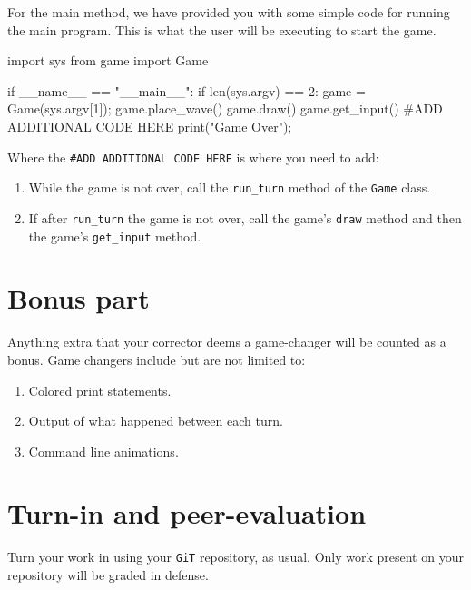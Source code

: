 \documentclass{42-en}
\begin{document}
\makeheaderfiles
For the main method, we have provided you with some simple code for running the main program.
This is what the user will be executing to start the game.
\begin{42pycode}
import sys
from game import Game

if __name__ == "__main__":
	if len(sys.argv) == 2:
		game = Game(sys.argv[1]);
		game.place_wave()
		game.draw()
		game.get_input()
		#ADD ADDITIONAL CODE HERE
		print("Game Over");
\end{42pycode}
Where the \texttt{\#ADD ADDITIONAL CODE HERE} is where you need to add:
\begin{enumerate}\itemsep7pt
    \item While the game is not over, call the \texttt{run\_turn} method of the \texttt{Game} class.
    \item If after \texttt{run\_turn} the game is not over, call the game's \texttt{draw} method and then the game's \texttt{get\_input} method.
\end{enumerate}

\nextexercice

\chapter{Bonus part}

Anything extra that your corrector deems a game-changer will be counted as a bonus.
Game changers include but are not limited to:
\begin{enumerate}\itemsep7pt
\item Colored print statements.
\item Output of what happened between each turn.
\item Command line animations.
\end{enumerate}

\chapter{Turn-in and peer-evaluation}

    Turn your work in using your \texttt{GiT} repository, as
    usual. Only work present on your repository will be graded in defense.

\end{document}

